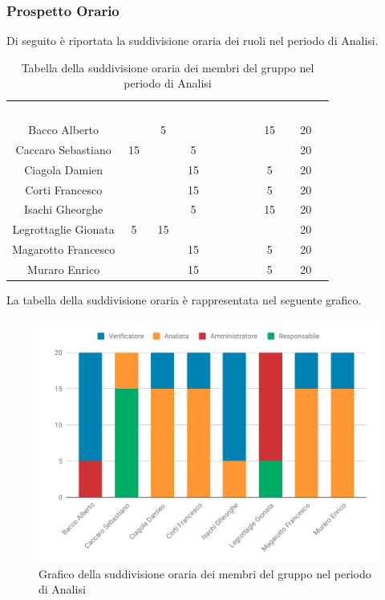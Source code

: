 \subsubsection{Prospetto Orario}
Di seguito è riportata la suddivisione oraria dei ruoli nel periodo di Analisi.




\begin{table}[H]	
	\begin{center}
	    \begin{tabular}{cccccccc}
			\rowcolor{greySWEight}
			\textcolor{white}{\textbf{Nome}} & \textcolor{white}{\textbf{Re}} & \textcolor{white}{\textbf{Am}} & \textcolor{white}{\textbf{An}} & \textcolor{white}{\textbf{Pj}} & \textcolor{white}{\textbf{Pr}} & \textcolor{white}{\textbf{Ve}} & \textcolor{white}{\textbf{Totale}}
			\\
			Bacco Alberto & & 5 & & & & 15 & 20 \\
			Caccaro Sebastiano & 15 & & 5 & & & & 20 \\
			Ciagola Damien & & & 15 & & & 5 & 20\\
			Corti Francesco & & & 15 & & & 5 & 20\\
			Isachi Gheorghe & & & 5 & & & 15 & 20\\
			Legrottaglie Gionata & 5 & 15 & & & & & 20\\
			Magarotto Francesco & & & 15 & & & 5 & 20\\
			Muraro Enrico & & & 15 & & & 5 & 20\\
			\end{tabular}
	    \caption{Tabella della suddivisione oraria dei membri del gruppo nel periodo di Analisi} \label{tab:tabellaPersoneAnalisi} 
	\end{center}
\end{table}

La tabella della suddivisione oraria è rappresentata nel seguente grafico.
\begin{figure}[H]
	\includegraphics[width=1\linewidth]{Preventivo/grafici/AN1.pdf}
	\caption{Grafico della suddivisione oraria dei membri del gruppo nel periodo di Analisi}
\end{figure}

